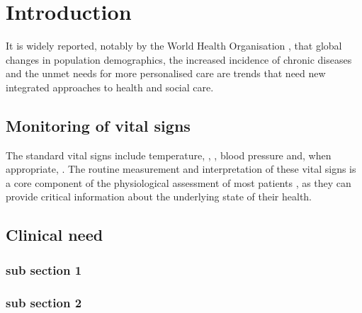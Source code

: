 \chapter{Introduction}
\label{chapter:introduction}

It is widely reported, notably by the World Health Organisation \cite{stroetmann2010can}, that global changes in population demographics, the increased incidence of chronic diseases and the unmet needs for more personalised care are trends that need new integrated approaches to health and social care. 

\lipsum[1-2]\cite{brooks1984infrared}

\lipsum[3-4]\cite{barker1987pulse,peacock1998oxygen,moller1993randomized}

\section{Monitoring of vital signs}

The standard vital signs include temperature, , , blood pressure and, when appropriate, . The routine measurement and interpretation of these vital signs is a core component of the physiological assessment of most patients \cite{prior1977physical,goldberg2005practical}, as they can provide critical information about the underlying state of their health. 

\lipsum[7-11]\cite{priya2012transition,haralick1973textural,Grass2012Online,NoninPulseOxOnline}

\section{Clinical need}

\lipsum[1-2]\cite{HidalgoEquivitalEQ02Online,poh2011advancements,poh2010non,verkruysse2008remote,wieringa2005contactless,wiki:bayerfilter,nonin9560oem,Mas_Fernandez_2003,hartley2003multiple}

\subsection{sub section 1}

\lipsum[3-6]\cite{schmidt1997animal,4036907,Orbanz2008,varjavand2002interactive,report:PCESC2005,HSU_05_2012,collins2015relating,abdi2010principal}

\subsection{sub section 2}

